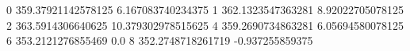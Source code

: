 0 359.37921142578125 6.167083740234375
1 362.1323547363281 8.92022705078125
2 363.5914306640625 10.379302978515625
4 359.2690734863281 6.05694580078125
6 353.2121276855469 0.0
8 352.2748718261719 -0.937255859375

